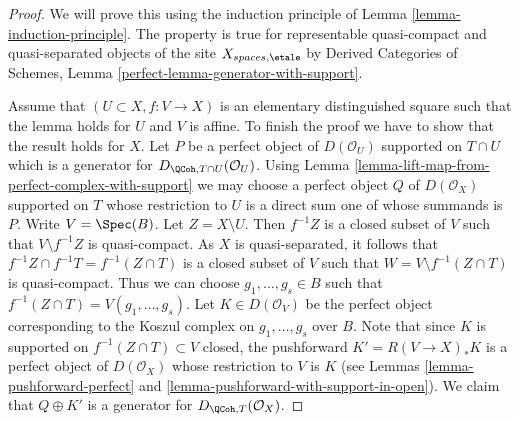 \begin{proof}
We will prove this using the induction principle of
Lemma \ref{lemma-induction-principle}.
The property is true for representable quasi-compact
and quasi-separated objects of the site
$X_{spaces, \etale}$ by
Derived Categories of Schemes, Lemma
\ref{perfect-lemma-generator-with-support}.

\medskip\noindent
Assume that $(U \subset X, f : V \to X)$ is an elementary distinguished
square such that the lemma holds for $U$ and $V$ is affine. To finish
the proof we have to show that the result holds for $X$.
Let $P$ be a perfect object of $D(\mathcal{O}_U)$ supported on $T \cap U$
which is a generator for $D_{\QCoh, T \cap U}(\mathcal{O}_U)$. Using
Lemma \ref{lemma-lift-map-from-perfect-complex-with-support}
we may choose a perfect object $Q$ of $D(\mathcal{O}_X)$ supported on $T$
whose restriction to $U$ is a direct sum one of whose summands is $P$.
Write $V = \Spec(B)$. Let $Z = X \setminus U$. Then $f^{-1}Z$ is a closed
subset of $V$ such that $V \setminus f^{-1}Z$ is quasi-compact. As $X$
is quasi-separated, it follows that
$f^{-1}Z \cap f^{-1}T = f^{-1}(Z \cap T)$ is a closed
subset of $V$ such that $W = V \setminus f^{-1}(Z \cap T)$ is quasi-compact.
Thus we can choose $g_1, \ldots, g_s \in B$ such that
$f^{-1}(Z \cap T) = V(g_1, \ldots, g_s)$.
Let $K \in D(\mathcal{O}_V)$ be the perfect object corresponding to the
Koszul complex on $g_1, \ldots, g_s$ over $B$. Note that since $K$ is
supported on $f^{-1}(Z \cap T) \subset V$ closed, the pushforward
$K' = R(V \to X)_*K$ is a perfect object of $D(\mathcal{O}_X)$ whose
restriction to $V$ is $K$ (see Lemmas \ref{lemma-pushforward-perfect}
and \ref{lemma-pushforward-with-support-in-open}).
We claim that $Q \oplus K'$ is a generator for
$D_{\QCoh, T}(\mathcal{O}_X)$.


\end{proof}
